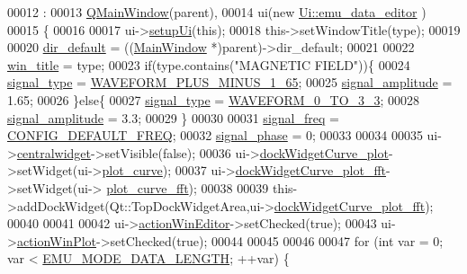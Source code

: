 \begin{DoxyCode}
00012                                                                :
00013     \hyperlink{a00010}{QMainWindow}(parent),
00014     ui(\textcolor{keyword}{new} \hyperlink{a00005}{Ui::emu\_data\_editor} )
00015 \{
00016 
00017     ui->\hyperlink{a00026_a33af8ac054888d9cc0833b699028b690}{setupUi}(\textcolor{keyword}{this});
00018     this->setWindowTitle(type);
00019 
00020     \hyperlink{a00004_aa55b7d8008e31fcc971692b493e7cf34}{dir\_default} = ((\hyperlink{a00006}{MainWindow} *)parent)->dir\_default;
00021 
00022     \hyperlink{a00004_a2abdde44f37258778dcc571e8cc7ed1a}{win\_title} = type;
00023     \textcolor{keywordflow}{if}(type.contains(\textcolor{stringliteral}{"MAGNETIC FIELD"}))\{
00024         \hyperlink{a00004_a070edaec5aee6ba1f5a6866bc32c8ce4}{signal\_type} = \hyperlink{a00034_a0923d3b365a36e1e8c401cec964aa36f}{WAVEFORM\_PLUS\_MINUS\_1\_65};
00025         \hyperlink{a00004_a73dabe63bd74afe2776e8136211dc36e}{signal\_amplitude} = 1.65;
00026     \}\textcolor{keywordflow}{else}\{
00027         \hyperlink{a00004_a070edaec5aee6ba1f5a6866bc32c8ce4}{signal\_type} = \hyperlink{a00034_ae18fed2471b16a8516d721ff60671dd9}{WAVEFORM\_0\_TO\_3\_3};
00028         \hyperlink{a00004_a73dabe63bd74afe2776e8136211dc36e}{signal\_amplitude} = 3.3;
00029     \}
00030 
00031     \hyperlink{a00004_a67039999d520fc483fab521fae5ddde4}{signal\_freq}      = \hyperlink{a00031_a985a153b3edd3d7d638137ae0b9e5e67}{CONFIG\_DEFAULT\_FREQ};
00032     \hyperlink{a00004_af08de88fdfe283086e3cca97a2965678}{signal\_phase}     = 0;
00033 
00034 
00035     ui->\hyperlink{a00026_afff870ab422d2b873976067827089af1}{centralwidget}->setVisible(\textcolor{keyword}{false});
00036     ui->\hyperlink{a00026_a0edc87fb115fede171c0da1f99000874}{dockWidgetCurve\_plot}->setWidget(ui->\hyperlink{a00026_a1d46308dee8db7e3c99af65f13055479}{plot\_curve});
00037     ui->\hyperlink{a00026_a7474d72172d9e269e8f3cb22bbe2fc86}{dockWidgetCurve\_plot\_fft}->setWidget(ui->
      \hyperlink{a00026_a2bdf46ca3b702151408e6f6bd96b3228}{plot\_curve\_fft});
00038 
00039     this->addDockWidget(Qt::TopDockWidgetArea,ui->\hyperlink{a00026_a7474d72172d9e269e8f3cb22bbe2fc86}{dockWidgetCurve\_plot\_fft});
00040 
00041 
00042     ui->\hyperlink{a00026_aa5d56420958ab4fd1239e29714d75e18}{actionWinEditor}->setChecked(\textcolor{keyword}{true});
00043     ui->\hyperlink{a00026_a0aeb289d8df9db6f4329e9000e44d511}{actionWinPlot}->setChecked(\textcolor{keyword}{true});
00044 
00045 
00046 
00047     \textcolor{keywordflow}{for} (\textcolor{keywordtype}{int} var = 0; var < \hyperlink{a00003_af4c3a8ad94feb4d7bda7f107f34baf41}{EMU\_MODE\_DATA\_LENGTH}; ++var) \{

\end{DoxyCode}
